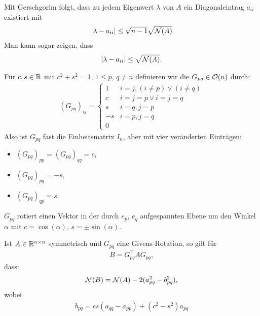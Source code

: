 \documentclass{report}
\begin{document}
	Mit Gerschgorim folgt, dass zu jedem Eigenwert $\lambda$ von $A$ ein Diagonaleintrag $a_{ii}$ existiert mit
	\begin{align*}
		\abs{\lambda - a_{ii}} \leq \sqrt{n-1}\sqrt{\mathcal{N}(A)}
	\end{align*}
	Man kann sogar zeigen, dass 
	\begin{align*}
		\abs{\lambda - a_{ii}} \leq \sqrt{\mathcal{N}(A)}.
	\end{align*}
	\begin{definition}
		Für $c,s \in \mathbb{R}$ mit $c^2 + s^2 = 1$, $1 \leq p$, $q \neq n$ definieren wir
		die  $G_{pq} \in \mathcal{O}(n)$ durch:
		\begin{align*}
			(G_{pq})_{ij} =
			\begin{cases}
				1 & i = j, (i \neq p) \vee (i \neq q)\\
				c & i = j = p \vee i = j = q\\
				s & i = q, j = p\\
				-s& i = p, j = q\\
				0 & 
			\end{cases}
		\end{align*}
		Also ist $G_{pq}$ fast die Einheitsmatrix $I_n$, aber mit vier veränderten Einträgen:
		\begin{itemize}
			\item $(G_{pq})_{pp} = (G_{pq})_{qq} = c$,
			\item $(G_{pq})_{pq} = -s$,
			\item $(G_{pq})_{qp} = s$.
		\end{itemize}   
	\end{definition}
	\begin{proposition}
		$G_{pq}$ rotiert einen Vektor in der durch $e_p$, $e_q$ aufgespannten Ebene um den Winkel $\alpha$ mit $c = \cos(\alpha)$, $s = \pm\sin(\alpha)$.
	\end{proposition}
	\begin{theorem}
		Ist $A \in \mathbb{R}^{n \times n}$ symmetrisch und $G_{pq}$ eine Givens-Rotation, so gilt für
		\begin{align*}
			B = G_{pq}^\top A G_{pq},
		\end{align*}
		dass:
		\begin{align*}
			\mathcal{N}(B) = \mathcal{N}(A) - 2(a_{pq}^2 - b_{pq}^2),
		\end{align*}
		wobei 
		\begin{align*}
			b_{pq} = cs(a_{qq} - a_{pp}) + (c^2 - s^2)a_{pq}
		\end{align*}
	\end{theorem}
\end{document}
